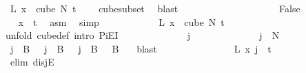 \begin{isabellebody}
\ {\isachardoublequoteopen}L{\isacharprime}{\kern0pt}\ x\ {\isasymin}\ cube\ N{\isacharprime}{\kern0pt}\ {\isacharparenleft}{\kern0pt}t\ {\isacharplus}{\kern0pt}\ {}{\isacharparenright}{\kern0pt}{\isachardoublequoteclose}\ \isamarkupfalse%
\ cube{\isacharunderscore}{\kern0pt}subset\ \isamarkupfalse%
\ blast\isanewline
\ \ \ \ \ \ \ \ \isamarkupfalse%
\isanewline
\ \ \ \ \ \ \ \ \ \ \isamarkupfalse%
\ False\isanewline
\ \ \ \ \ \ \ \ \ \ \isamarkupfalse%
\ \isamarkupfalse%
\ {\isachardoublequoteopen}x\ {\isacharequal}{\kern0pt}\ t{\isachardoublequoteclose}\ \isamarkupfalse%
\ asm\ \isamarkupfalse%
\ simp\isanewline
\ \ \ \ \ \ \ \ \ \ \isamarkupfalse%
\ {\isachardoublequoteopen}L{\isacharprime}{\kern0pt}\ x\ {\isasymin}\ cube\ N{\isacharprime}{\kern0pt}\ {\isacharparenleft}{\kern0pt}t\ {\isacharplus}{\kern0pt}\ {}{\isacharparenright}{\kern0pt}{\isachardoublequoteclose}\isanewline
\ \ \ \ \ \ \ \ \ \ \isamarkupfalse%
{\isacharparenleft}{\kern0pt}unfold\ cube{\isacharunderscore}{\kern0pt}def{\isacharcomma}{\kern0pt}\ intro\ PiE{\isacharunderscore}{\kern0pt}I{\isacharparenright}{\kern0pt}\isanewline
\ \ \ \ \ \ \ \ \ \ \ \ \isamarkupfalse%
\ j\isanewline
\ \ \ \ \ \ \ \ \ \ \ \ \isamarkupfalse%
\ {\isachardoublequoteopen}j\ {\isasymin}\ {\isacharbraceleft}{\kern0pt}{\isachardot}{\kern0pt}{\isachardot}{\kern0pt}{\isacharless}{\kern0pt}N{\isacharprime}{\kern0pt}{\isacharbraceright}{\kern0pt}{\isachardoublequoteclose}\isanewline
\ \ \ \ \ \ \ \ \ \ \ \ \isamarkupfalse%
\ {\isachardoublequoteopen}j\ {\isasymin}\ B\ {}\ {\isasymor}\ j\ {\isasymin}\ B\ {}\ {\isasymor}\ j\ {\isasymnotin}\ {\isacharparenleft}{\kern0pt}B\ {}\ {\isasymunion}\ B\ {}{\isacharparenright}{\kern0pt}{\isachardoublequoteclose}\ \isamarkupfalse%
\ blast\isanewline
\ \ \ \ \ \ \ \ \ \ \ \ \isamarkupfalse%
\ \isamarkupfalse%
\ {\isachardoublequoteopen}L{\isacharprime}{\kern0pt}\ x\ j\ {\isasymin}\ {\isacharbraceleft}{\kern0pt}{\isachardot}{\kern0pt}{\isachardot}{\kern0pt}{\isacharless}{\kern0pt}t\ {\isacharplus}{\kern0pt}\ {}{\isacharbraceright}{\kern0pt}{\isachardoublequoteclose}\isanewline
\ \ \ \ \ \ \ \ \ \ \ \ \isamarkupfalse%
\ {\isacharparenleft}{\kern0pt}elim\ disjE{\isacharparenright}{\kern0pt}\isanewline
\ \ \ \ \ \ \ \ \ \ \ \ \ \ \isamarkupfalse%

\end{isabellebody}
